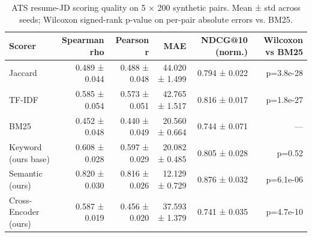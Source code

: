 \begin{table}[t]
\centering
\caption{ATS resume-JD scoring quality on 5 × 200 synthetic pairs. Mean ± std across seeds; Wilcoxon signed-rank p-value on per-pair absolute errors vs. BM25.}
\label{tab:ats}
\begin{tabular}{lrrrrr}
\hline
Scorer & Spearman rho & Pearson r & MAE & NDCG@10 (norm.) & Wilcoxon vs BM25 \\
\hline
Jaccard & 0.489 ± 0.044 & 0.488 ± 0.048 & 44.020 ± 1.499 & 0.794 ± 0.022 & p=3.8e-28 \\
TF-IDF & 0.585 ± 0.054 & 0.573 ± 0.051 & 42.765 ± 1.517 & 0.816 ± 0.017 & p=1.8e-27 \\
BM25 & 0.452 ± 0.048 & 0.440 ± 0.049 & 20.560 ± 0.664 & 0.744 ± 0.071 & — \\
Keyword (ours base) & 0.608 ± 0.028 & 0.597 ± 0.029 & 20.082 ± 0.485 & 0.805 ± 0.028 & p=0.52 \\
Semantic (ours) & 0.820 ± 0.030 & 0.816 ± 0.026 & 12.129 ± 0.729 & 0.876 ± 0.032 & p=6.1e-06 \\
Cross-Encoder (ours) & 0.587 ± 0.019 & 0.456 ± 0.020 & 37.593 ± 1.379 & 0.741 ± 0.035 & p=4.7e-10 \\
\hline
\end{tabular}
\end{table}
